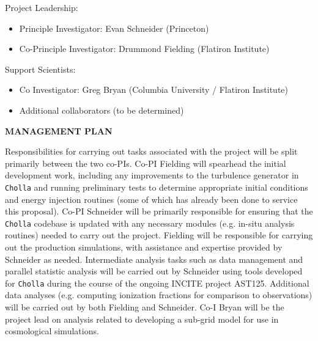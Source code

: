\documentclass[11pt,letterpaper,english]{article}
\begin{document}
\begin{flushleft}
Project Leadership:
\vspace{-.15in}
\begin{itemize}
\item Principle Investigator: Evan Schneider (Princeton) \\ 
\item Co-Principle Investigator: Drummond Fielding (Flatiron Institute) \\
\end{itemize} 

Support Scientists:
\vspace{-.15in}
\begin{itemize}
\item Co Investigator: Greg Bryan (Columbia University / Flatiron Institute) \\ 
\item Additional collaborators (to be determined)
\end{itemize} 

{\noindent \bf  {MANAGEMENT PLAN}}

Responsibilities for carrying out tasks associated with the project will be split primarily between the two co-PIs. Co-PI Fielding will spearhead the initial development work, including any improvements to the turbulence generator in {\tt Cholla} and running preliminary tests to determine appropriate initial conditions and energy injection routines (some of which has already been done to service this proposal). Co-PI Schneider will be primarily responsible for ensuring that the {\tt Cholla} codebase is updated with any necessary modules (e.g. in-situ analysis routines) needed to carry out the project. Fielding will be responsible for carrying out the production simulations, with assistance and expertise provided by Schneider as needed. Intermediate analysis tasks such as data management and parallel statistic analysis will be carried out by Schneider using tools developed for {\tt Cholla} during the course of the ongoing INCITE project AST125. Additional data analyses (e.g. computing ionization fractions for comparison to observations) will be carried out by both Fielding and Schneider. Co-I Bryan will be the project lead on analysis related to developing a sub-grid model for use in cosmological simulations.


\end{flushleft}
\end{document}

